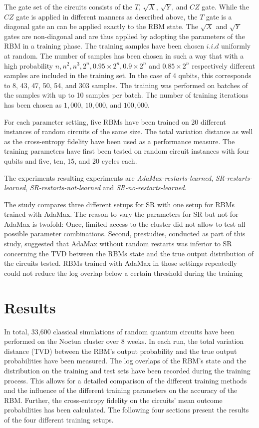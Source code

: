 The gate set of the circuits consists of the $T$, $\sqrt{X}$, $\sqrt{Y}$, and $CZ$ gate. While the $CZ$ gate is 
applied in different manners as described above, the $T$ gate is a diagonal gate an can be applied exactly to the RBM state.
The $\sqrt{X}$ and $\sqrt{Y}$ gates are non-diagonal and are thus applied by adopting the parameters of the RBM in 
a training phase. The training samples have been chosen $i.i.d$ uniformly at random. The number of samples has been chosen 
in such a way that with a high probability $n, n^2, n^3, 2^n, 0.95 \times 2^n, 0.9 \times 2^n$ and $0.85 \times 2^n$ 
respectively different samples are included in the training set. In the case of 4 qubits, this corresponds to 
8, 43, 47, 50, 54, and 303 samples. The training was performed on batches of the samples with 
up to 10 samples per batch.
The number of training iterations has been chosen as $1,000$, $10,000$, and $100,000$. 

For each parameter setting, five RBMs have been trained on 20 different instances of random circuits of the same 
size. The total variation distance as well as the cross-entropy fidelity have been used as a performance measure.
The training parameters have first been tested on random circuit instances with four qubits and 
five, ten, 15, and 20 cycles each. 

The experiments resulting experiments are \textit{AdaMax-restarts-learned}, \textit{SR-restarts-learned}, 
\textit{SR-restarts-not-learned} and \textit{SR-no-restarts-learned}. 

The study compares three different setups for SR with one setup for RBMs trained with 
AdaMax. The reason to vary the parameters for SR but not for AdaMax is twofold:
Once, limited access to the cluster did not allow to test all possible parameter combinations. Second,
prestudies, conducted as part of this study, suggested that AdaMax without random restarts 
was inferior to SR concerning the TVD between the RBMs state and the true output distribution of the 
circuits tested. RBMs trained with AdaMax in those settings repeatedly could not reduce the 
log overlap below a certain threshold during the training

\section{Results}

In total, 33,600 classical simulations of random quantum circuits have been performed 
on the Noctua cluster over 8 weeks. In each run, the total variation distance (TVD)
between the RBM's output probability and the true output probabilities have been measured.
 The log overlaps of the RBM's state and the distribution on the training and test sets have been recorded during the training process. This allows for a detailed comparison
of the different training methods and the influence of the different training parameters on the 
accuracy of the RBM. Further, the cross-entropy fidelity on the circuits' mean outcome probabilities
has been calculated. The following four sections present the results of the four different training setups.


